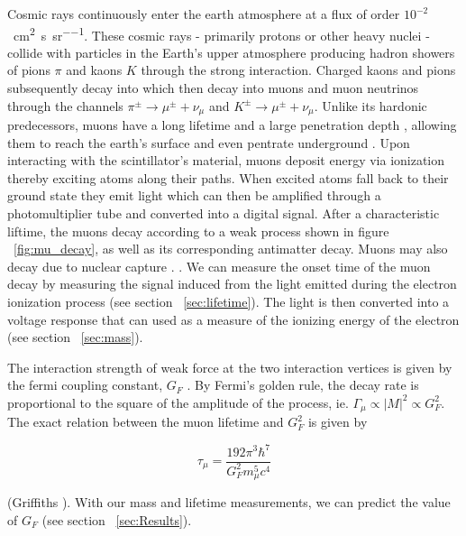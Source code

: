 \documentclass[aps,prb,twocolumn,superscriptaddress,floatfix,longbibliography,citeautoscript]{revtex4-2}
\begin{document}
 Cosmic rays continuously enter the earth atmosphere at a flux of order $10^{-2}$\si{\per\centi\metre\squared\per\second\per\steradian}. These cosmic rays - primarily protons or other heavy nuclei - collide with particles in the Earth's upper atmosphere producing hadron showers of pions $\pi$ and kaons $K$ through the strong interaction. Charged kaons and pions subsequently decay into which then decay into muons and muon neutrinos through the channels $\pi^{\pm} \to \mu^{\pm} + \nu_\mu$ and $K^{\pm} \to \mu^{\pm} + \nu_\mu$. Unlike its hardonic predecessors, muons have a long lifetime and a large penetration depth , allowing them to reach the earth's surface and even pentrate underground \cite{MuonLifetimeWiki}. Upon interacting with the scintillator's material, muons deposit energy via ionization thereby exciting atoms along their paths. When excited atoms fall back to their ground state they emit light which can then be amplified through a photomultiplier tube and converted into a digital signal. After a characteristic liftime, the muons decay according to a weak process shown in figure ~\ref{fig:mu_decay}, as well as its corresponding antimatter decay. Muons may also decay due to nuclear capture . \cite{griffiths2008particles}. We can measure the onset time of the muon decay by measuring the signal induced from the light emitted during the electron ionization process (see section ~\ref{sec:lifetime}). The light is then converted into a voltage response that can used as a measure of the ionizing energy of the electron (see section ~\ref{sec:mass}).

 The interaction strength of weak force at the two interaction vertices is given by the fermi coupling constant, $G_F$ . By Fermi's golden rule, the decay rate is proportional to the square of the amplitude of the process, ie. $\Gamma_\mu \propto \left| M \right|^2 \propto G_F^2$. The exact relation between the muon lifetime and $G_F^2$ is given by 

\begin{equation}
    \tau_\mu = \frac{192\pi^3\hbar^7}{G_F^2m_\mu^5 c^4}
\end{equation}

(Griffiths \cite[Chapter 9, p.~314]{griffiths2008particles}). With our mass and lifetime measurements, we can predict the value of $G_F$ (see section ~\ref{sec:Results}).
\end{document}
